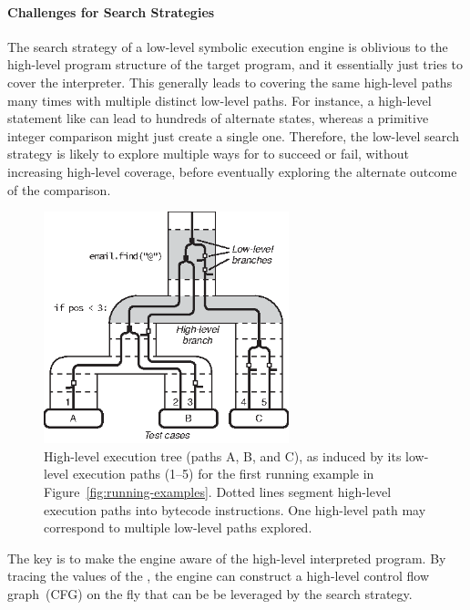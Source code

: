 \paragraph{Challenges for Search Strategies}
%
The search strategy of a low-level symbolic execution engine is oblivious to the high-level program structure of the target program, and it essentially just tries to cover the interpreter. This generally leads to covering the same high-level paths many times with multiple distinct low-level paths.
%
For instance, a high-level statement like  can lead to hundreds of alternate states, whereas a primitive integer comparison might just create a single one. Therefore, the low-level search strategy is likely to explore multiple ways for  to succeed or fail, without increasing high-level coverage, before eventually exploring the alternate outcome of the comparison.

\begin{figure}
  \centering
  \includegraphics[width=2.8in]{figures/chef/hl-symbex}
  \caption{High-level execution tree (paths A, B, and C), as induced by its low-level execution paths (1--5) for the first running example in Figure~\ref{fig:running-examples}.  Dotted lines segment high-level execution paths into bytecode instructions.  One high-level path may correspond to multiple low-level paths explored.}
  \label{fig:hl-symbex}
\end{figure}

The key is to make the engine aware of the high-level interpreted program. By tracing the values of the \hlpc, the engine can construct a high-level control flow graph~(CFG) on the fly that can be be leveraged by the search strategy.


